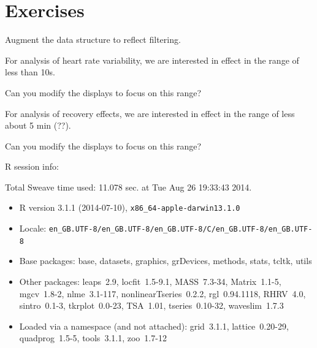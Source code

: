 \documentclass[a4paper, english, utf8]{amsart}
\newcommand{\R}{{\normalfont\textsf{R}}{}}
\begin{document}

\section{Exercises}
\begin{exca}
Augment the data structure to reflect filtering.
\end{exca}

\begin{exca}
For analysis of heart rate variability, we are interested in effect in the range of less than 10s.

Can you modify the displays to focus on this range?
\end{exca}

\begin{exca}
For analysis of recovery effects, we are interested in effect in the range of less about 5 min (??).

Can you modify the displays to focus on this range?
\end{exca}

\clearpage
\nocite{*}
%

%
\clearpage

\printindex

%

\clearpage
\R{} session info:

Total Sweave time used: 11.078 sec. at Tue Aug 26 19:33:43 2014.

{\tiny
\begin{itemize}\raggedright
  \item R version 3.1.1 (2014-07-10), \verb|x86_64-apple-darwin13.1.0|
  \item Locale: \verb|en_GB.UTF-8/en_GB.UTF-8/en_GB.UTF-8/C/en_GB.UTF-8/en_GB.UTF-8|
  \item Base packages: base, datasets, graphics, grDevices,
    methods, stats, tcltk, utils
  \item Other packages: leaps~2.9, locfit~1.5-9.1, MASS~7.3-34,
    Matrix~1.1-5, mgcv~1.8-2, nlme~3.1-117,
    nonlinearTseries~0.2.2, rgl~0.94.1118, RHRV~4.0,
    sintro~0.1-3, tkrplot~0.0-23, TSA~1.01, tseries~0.10-32,
    waveslim~1.7.3
  \item Loaded via a namespace (and not attached): grid~3.1.1,
    lattice~0.20-29, quadprog~1.5-5, tools~3.1.1, zoo~1.7-12
\end{itemize}}
\end{document}

